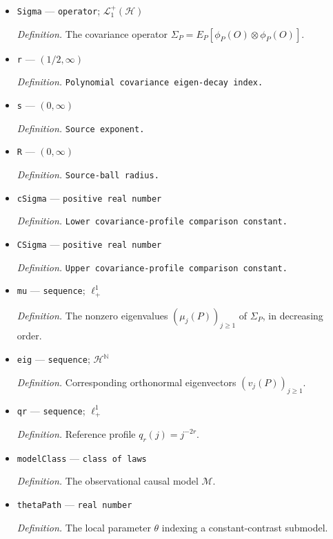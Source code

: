 \documentclass{article}
\begin{document}
\begin{itemize}
  \item \texttt{Sigma} --- \texttt{operator}; \(\mathcal L_1^+(\mathcal H)\)
  \par\smallskip\noindent\emph{Definition.} The covariance operator \(\Sigma_P=E_P[\phi_P(O)\otimes\phi_P(O)]\).
  \item \texttt{r} --- \((1/2,\infty)\)
  \par\smallskip\noindent\emph{Definition.} \texttt{Polynomial covariance eigen-\allowbreak{}decay index.}
  \item \texttt{s} --- \((0,\infty)\)
  \par\smallskip\noindent\emph{Definition.} \texttt{Source exponent.}
  \item \texttt{R} --- \((0,\infty)\)
  \par\smallskip\noindent\emph{Definition.} \texttt{Source-\allowbreak{}ball radius.}
  \item \texttt{cSigma} --- \texttt{positive real number}
  \par\smallskip\noindent\emph{Definition.} \texttt{Lower covariance-\allowbreak{}profile comparison constant.}
  \item \texttt{CSigma} --- \texttt{positive real number}
  \par\smallskip\noindent\emph{Definition.} \texttt{Upper covariance-\allowbreak{}profile comparison constant.}
  \item \texttt{mu} --- \texttt{sequence}; \(\ell^1_+\)
  \par\smallskip\noindent\emph{Definition.} The nonzero eigenvalues \((\mu_j(P))_{j\ge1}\) of \(\Sigma_P\), in decreasing order.
  \item \texttt{eig} --- \texttt{sequence}; \(\mathcal H^{\mathbb N}\)
  \par\smallskip\noindent\emph{Definition.} Corresponding orthonormal eigenvectors \((v_j(P))_{j\ge1}\).
  \item \texttt{qr} --- \texttt{sequence}; \(\ell^1_+\)
  \par\smallskip\noindent\emph{Definition.} Reference profile \(q_r(j)=j^{-2r}\).
  \item \texttt{modelClass} --- \texttt{class of laws}
  \par\smallskip\noindent\emph{Definition.} The observational causal model \(\mathcal M\).
  \item \texttt{thetaPath} --- \texttt{real number}
  \par\smallskip\noindent\emph{Definition.} The local parameter \(\theta\) indexing a constant-contrast submodel.

\end{itemize}
\end{document}

